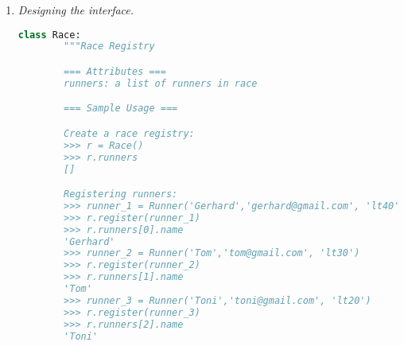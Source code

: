 \documentclass[12pt]{article}
\begin{document}
\begin{enumerate}[1.]
\begin{mdframed}
    \bigskip

    \begin{lstlisting}[language=Python]
    class Race:
        """
        === Sample Usage ===

        Create a race registry:
        >>> r = Race()
        >>> r.runners
        []

        Registering runners:
        >>> runner_1 = Runner('Gerhard','gerhard@gmail.com', 'lt40')
        >>> r.register(runner_1)
        >>> r.runners[0].name
        'Gerhard'
        >>> runner_2 = Runner('Tom','tom@gmail.com', 'lt30')
        >>> r.register(runner_2)
        >>> r.runners[1].name
        'Tom'
        >>> runner_3 = Runner('Toni','toni@gmail.com', 'lt20')
        >>> r.register(runner_3)
        >>> r.runners[2].name
        'Toni'

        Updating runner in a speed category:
        >>> runner_4 = r.get_runner('Gerhard')
        >>> runner_4.edit_category('lt30')
        >>> runner_4.speed_category
        'lt30'

        Get all runners in a speed category:
        >>> r.get_runners('lt30')
        ['Gerhard','Tom']
        """


    class Runner:
        """
        === Sample Usage ===
        Create a runner:
        >>> runner = Runner('Gerhard', 'gerhard@gmail.com','lt30')
        >>> runner.name
        'Gerhard'
        >>> runner.email
        'gerhard@gmail.com'
        >>> runner.speed_category
        'lt30'
        """

    if __name__ == '__main__':
        import doctest
        doctest.testmod()

    \end{lstlisting}
\end{mdframed}

\item \textit{Designing the interface.}

\begin{lstlisting}[language=Python]
    class Race:
        """Race Registry

        === Attributes ===
        runners: a list of runners in race

        === Sample Usage ===

        Create a race registry:
        >>> r = Race()
        >>> r.runners
        []

        Registering runners:
        >>> runner_1 = Runner('Gerhard','gerhard@gmail.com', 'lt40')
        >>> r.register(runner_1)
        >>> r.runners[0].name
        'Gerhard'
        >>> runner_2 = Runner('Tom','tom@gmail.com', 'lt30')
        >>> r.register(runner_2)
        >>> r.runners[1].name
        'Tom'
        >>> runner_3 = Runner('Toni','toni@gmail.com', 'lt20')
        >>> r.register(runner_3)
        >>> r.runners[2].name
        'Toni'


\end{lstlisting}
\end{enumerate}
\end{document}
